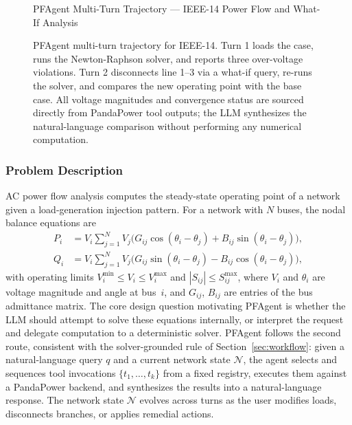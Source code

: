 \documentclass[journal,onecolumn]{IEEEtran} %
\begin{document}
\begin{figure}[ht]
\begin{minipage}{0.94\linewidth}
\begin{promptfigure}{PFAgent Multi-Turn Trajectory --- IEEE-14 Power Flow and What-If Analysis}
{}
\end{promptfigure}
\end{minipage}
\caption{PFAgent multi-turn trajectory for IEEE-14. Turn 1 loads the case, runs the Newton-Raphson solver, and reports three over-voltage violations. Turn 2 disconnects line 1--3 via a what-if query, re-runs the solver, and compares the new operating point with the base case. All voltage magnitudes and convergence status are sourced directly from PandaPower tool outputs; the LLM synthesizes the natural-language comparison without performing any numerical computation.}
\label{fig:pf_trajectory}
\end{figure}

 \subsubsection*{\textbf{Problem Description}}
 AC power flow analysis computes the steady-state operating point of a network given a load-generation injection pattern. For a network with $N$ buses, the nodal balance equations are
 \begin{align}
 P_i &= V_i \sum_{j=1}^{N} V_j
   \bigl(G_{ij}\cos(\theta_i-\theta_j)
         + B_{ij}\sin(\theta_i-\theta_j)\bigr), \label{eq:pf_p}\\
 Q_i &= V_i \sum_{j=1}^{N} V_j
   \bigl(G_{ij}\sin(\theta_i-\theta_j)
         - B_{ij}\cos(\theta_i-\theta_j)\bigr), \label{eq:pf_q}
 \end{align}
 with operating limits $V_i^{\min} \le V_i \le V_i^{\max}$ and $|S_{ij}| \le S_{ij}^{\max}$, where $V_i$ and $\theta_i$ are voltage magnitude and angle at bus~$i$, and $G_{ij}$, $B_{ij}$ are entries of the bus admittance matrix.
 The core design question motivating PFAgent is whether the LLM should attempt to solve these equations internally, or interpret the request and delegate computation to a deterministic solver. PFAgent follows the second route, consistent with the solver-grounded rule of Section~\ref{sec:workflow}: given a natural-language query $q$ and a current network state $\mathcal{N}$, the agent selects and sequences tool invocations $\{t_1,\ldots,t_k\}$ from a fixed registry, executes them against a PandaPower backend, and synthesizes the results into a natural-language response. The network state $\mathcal{N}$ evolves across turns as the user modifies loads, disconnects branches, or applies remedial actions.
\end{document}
